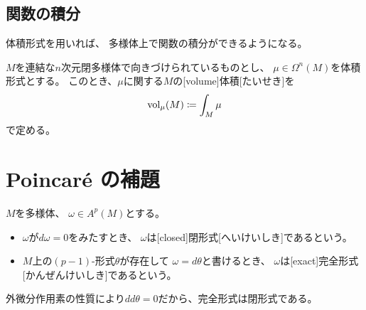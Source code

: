 \documentclass[report]{jlreq}
\begin{document}
\subsection{関数の積分}

体積形式を用いれば、
多様体上で関数の積分ができるようになる。

\begin{definition}[体積形式による積分]
    \TODO{}
\end{definition}

\begin{definition}[体積]
    $M$を連結な$n$次元閉多様体で向きづけられているものとし、
    $\mu \in \Omega^n(M)$を体積形式とする。
    このとき、$\mu$に関する$M$の[volume]{体積}[たいせき]を
    \begin{equation}
        \mathrm{vol}_\mu(M) \coloneqq \int_M \mu
    \end{equation}
    で定める。
\end{definition}


%
\section{Poincar\'{e} の補題}

\begin{definition}[閉形式と完全形式]
    $M$を多様体、
    $\omega \in A^p(M)$とする。
    \begin{itemize}
        \item $\omega$が$d\omega = 0$をみたすとき、
            $\omega$は[closed]{閉形式}[へいけいしき]であるという。
        \item $M$上の$(p - 1)$-形式$\theta$が存在して
            $\omega = d\theta$と書けるとき、
            $\omega$は[exact]{完全形式}[かんぜんけいしき]であるという。
    \end{itemize}
    外微分作用素の性質により$dd\theta = 0$だから、完全形式は閉形式である。
\end{definition}
\end{document}
